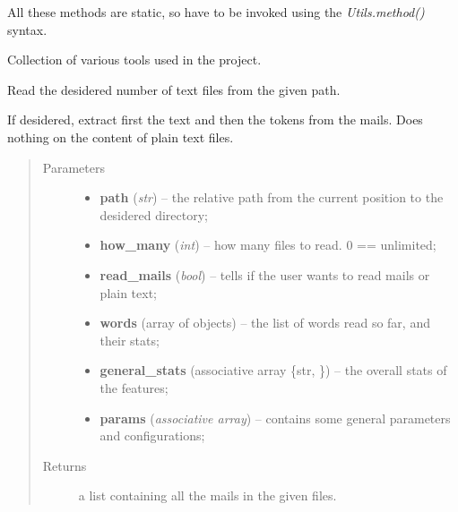 \documentclass[letterpaper,10pt,english]{sphinxmanual}
\begin{document}
All these methods are static, so have to be invoked using the
\emph{Utils.method()} syntax.
\label{index:module-utils}

\begin{fulllineitems}
\label{index:utils.Utils}
Collection of various tools used in the project.

\begin{fulllineitems}
\label{index:utils.Utils._read_files}
Read the desidered number of text files from the given path.

If desidered, extract first the text and then the tokens
from the mails. Does nothing on the content of plain text files.
\begin{quote}\begin{description}
\item[{Parameters}] \leavevmode\begin{itemize}
\item {} 
\textbf{path} (\emph{str}) -- the relative path from the current position           to the desidered directory;

\item {} 
\textbf{how\_many} (\emph{int}) -- how many files to read. 0 == unlimited;

\item {} 
\textbf{read\_mails} (\emph{bool}) -- tells if the user wants to read mails or plain text;

\item {} 
\textbf{words} (array of {\hyperref[index:gen_stat.Word]{}} objects) -- the list of words read so far, and their stats;

\item {} 
\textbf{general\_stats} (associative array \{str, {\hyperref[index:gen_stat.Stat]{}}\}) -- the overall stats of the features;

\item {} 
\textbf{params} (\emph{associative array}) -- contains some general parameters and configurations;

\end{itemize}

\item[{Returns}] \leavevmode
a list containing all the mails in the given files.


\end{description}
\end{quote}
\end{fulllineitems}
\end{fulllineitems}
\end{document}
